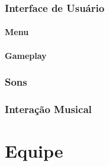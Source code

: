 \documentclass[11pt]{article}
\begin{document}
\section{Interface de Usuário}
\subsection{Menu}
 
\subsection{Gameplay}
 
\section{Sons}
 
\section{Interação Musical}
\newpage
\part{Equipe}
\end{document}
